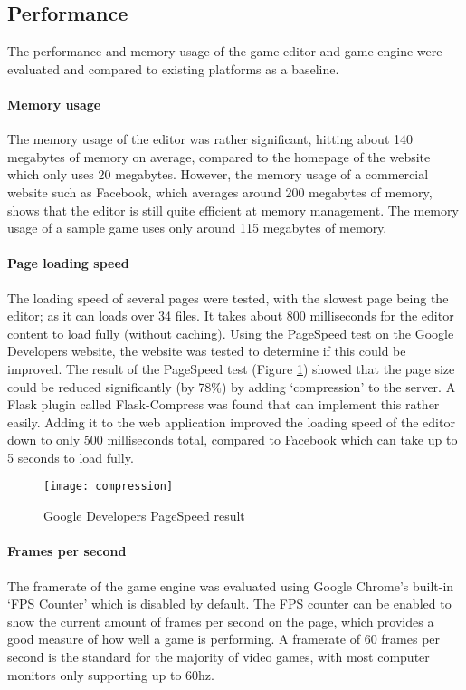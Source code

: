 	\subsection{Performance}
	The performance and memory usage of the game editor and game engine were evaluated and compared to existing platforms as a baseline.

	\paragraph{Memory usage}
	The memory usage of the editor was rather significant, hitting about 140 megabytes of memory on average, compared to the homepage of the website which only uses 20 megabytes. However, the memory usage of a commercial website such as Facebook, which averages around 200 megabytes of memory, shows that the editor is still quite efficient at memory management. The memory usage of a sample game uses only around 115 megabytes of memory.

	\paragraph{Page loading speed}
	The loading speed of several pages were tested, with the slowest page being the editor; as it can loads over 34 files. It takes about 800 milliseconds for the editor content to load fully (without caching). Using the PageSpeed test on the Google Developers website, the website was tested to determine if this could be improved.\cite{pagespeed} The result of the PageSpeed test (Figure \ref{fig:pagespeed}) showed that the page size could be reduced significantly (by 78\%) by adding `compression' to the server. A Flask plugin called Flask-Compress was found that can implement this rather easily.\cite{flaskcompress} Adding it to the web application improved the loading speed of the editor down to only 500 milliseconds total, compared to Facebook which can take up to 5 seconds to load fully.

\begin{figure}[h]
	\centering
	\texttt{[image: compression]}
	\caption{Google Developers PageSpeed result}
	\label{fig:pagespeed}
\end{figure}

	\paragraph{Frames per second}
	The framerate of the game engine was evaluated using Google Chrome's built-in `FPS Counter' which is disabled by default. The FPS counter can be enabled to show the current amount of frames per second on the page, which provides a good measure of how well a game is performing. A framerate of 60 frames per second is the standard for the majority of video games, with most computer monitors only supporting up to 60hz.

